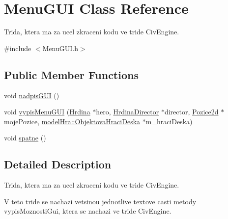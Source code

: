 \hypertarget{class_menu_g_u_i}{\section{Menu\-G\-U\-I Class Reference}
\label{class_menu_g_u_i}
}


Trida, ktera ma za ucel zkraceni kodu ve tride Civ\-Engine.  




{\ttfamily \#include $<$Menu\-G\-U\-I.\-h$>$}

\subsection*{Public Member Functions}
\begin{DoxyCompactItemize}
\item 
void \hyperlink{class_menu_g_u_i_ab73338a25977c36ae069835f9d942466}{nadpis\-G\-U\-I} ()
\item 
void \hyperlink{class_menu_g_u_i_a40d6a7823135bdf6b9b087b51f505ce3}{vypis\-Menu\-G\-U\-I} (\hyperlink{class_hrdina}{Hrdina} $\ast$hero, \hyperlink{class_hrdina_director}{Hrdina\-Director} $\ast$director, \hyperlink{struct_pozice2d}{Pozice2d} $\ast$moje\-Pozice, \hyperlink{classmodel_hra_1_1_objektova_hraci_deska}{model\-Hra\-::\-Objektova\-Hraci\-Deska} $\ast$m\-\_\-hraci\-Deska)
\item 
void \hyperlink{class_menu_g_u_i_a70f8d997a67cb7515b03fa83512bcf9f}{spatne} ()
\end{DoxyCompactItemize}


\subsection{Detailed Description}
Trida, ktera ma za ucel zkraceni kodu ve tride Civ\-Engine. 

V teto tride se nachazi vetsinou jednotlive textove casti metody vypis\-Moznosti\-Gui, ktera se nachazi ve tride Civ\-Engine. 

